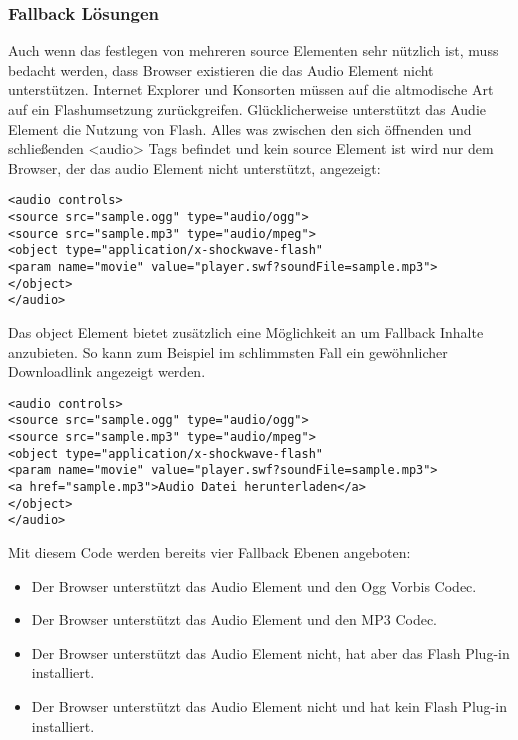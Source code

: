 \subsubsection{Fallback Lösungen}
Auch wenn das festlegen von mehreren source Elementen sehr nützlich ist, muss
bedacht werden, dass Browser existieren die das Audio Element nicht unterstützen.
Internet Explorer und Konsorten müssen auf die altmodische Art auf ein Flashumsetzung
zurückgreifen. Glücklicherweise unterstützt das Audie Element die Nutzung von Flash.
Alles was zwischen den sich öffnenden und schließenden <audio> Tags befindet und
kein source Element ist wird nur dem Browser, der das audio Element nicht unterstützt,
angezeigt:
\begin{verbatim}
<audio controls>
<source src="sample.ogg" type="audio/ogg">
<source src="sample.mp3" type="audio/mpeg">
<object type="application/x-shockwave-flash"
<param name="movie" value="player.swf?soundFile=sample.mp3">
</object>
</audio>
\end{verbatim}
Das object Element bietet zusätzlich eine Möglichkeit an um Fallback Inhalte anzubieten.
So kann zum Beispiel im schlimmsten Fall ein gewöhnlicher Downloadlink angezeigt werden.
\begin{verbatim}
<audio controls>
<source src="sample.ogg" type="audio/ogg">
<source src="sample.mp3" type="audio/mpeg">
<object type="application/x-shockwave-flash"
<param name="movie" value="player.swf?soundFile=sample.mp3">
<a href="sample.mp3">Audio Datei herunterladen</a>
</object>
</audio>
\end{verbatim}
Mit diesem Code werden bereits vier Fallback Ebenen angeboten:
\begin{itemize}
\item{Der Browser unterstützt das Audio Element und den Ogg Vorbis Codec.}
\item{Der Browser unterstützt das Audio Element und den MP3 Codec.}
\item{Der Browser unterstützt das Audio Element nicht, hat aber das Flash Plug-in installiert.}
\item{Der Browser unterstützt das Audio Element nicht und hat kein Flash Plug-in installiert.}
\end{itemize}

